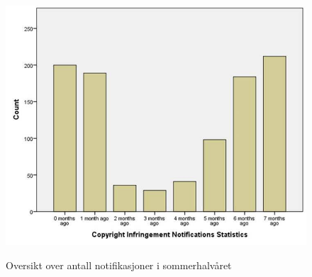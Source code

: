 \begin{figure}[H]
    \centering
    \includegraphics[scale=0.8]{case_1/bilder/copyright.jpg}
    \label{fig:case_1/bilder/copyright.jpg}
    \caption[Copyright Infringement Notifications]{Oversikt over antall notifikasjoner i sommerhalvåret}
\end{figure}

